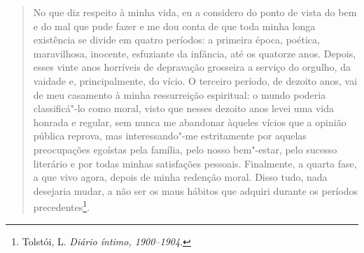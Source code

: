 {{\begin{quote}
No que diz respeito à minha vida, eu a considero do ponto de vista do
bem e do mal que pude fazer e me dou conta de que toda minha longa
existência se divide em quatro períodos: a primeira época, poética,
maravilhosa, inocente, esfuziante da infância, até os quatorze anos.
Depois, esses vinte anos horríveis de depravação grosseira a serviço do
orgulho, da vaidade e, principalmente, do vício. O terceiro período, de
dezoito anos, vai de meu casamento à minha ressurreição espiritual: o
mundo poderia classificá"-lo como moral, visto que nesses dezoito anos
levei uma vida honrada e regular, sem nunca me abandonar àqueles vícios
que a opinião pública reprova, mas interessando"-me estritamente por
aquelas preocupações egoístas pela família, pelo nosso bem"-estar, pelo
sucesso literário e por todas minhas satisfações pessoais. Finalmente,
a quarta fase, a que vivo agora, depois de minha redenção moral. Disso
tudo, nada desejaria mudar, a não ser os maus hábitos que adquiri
durante os períodos precedentes\footnote{Tolstói, L. \emph{Diário íntimo, 1900--1904}.}.
\end{quote}

}}
